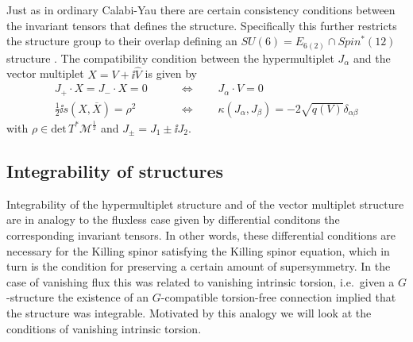 Just as in ordinary Calabi-Yau there are certain consistency conditions between the invariant tensors that defines the structure. Specifically this further restricts the structure group to their overlap defining an $SU(6)=E_{6(2)}\cap Spin^*(12)$ structure \cite{Grana:2009im}. The compatibility condition between the hypermultiplet $J_\alpha$ and the vector multiplet $X=V+\ii \hat{V}$ is given by 
\begin{equation}\label{eq:CompatibilityVectorHyperStructure}
    \begin{aligned}
        J_+ \cdot X = J_-\cdot X = 0\qquad&\Longleftrightarrow\qquad J_\alpha\cdot V = 0\\
        \frac{1}{2}\ii s(X,\overbar{X}) = \rho^2\qquad &\Longleftrightarrow\qquad \kappa(J_\alpha,J_\beta) = -2\sqrt{q(V)}\delta_{\alpha\beta}
    \end{aligned}
\end{equation}
with $\rho\in\text{det}\, T^*\mathcal{M}^\frac{1}{2}$ and $J_\pm = J_1\pm \ii J_2$. 




\subsection{Integrability of structures}

Integrability of the hypermultiplet structure and of the vector multiplet structure are in analogy to the fluxless case given by differential conditons the corresponding invariant tensors. In other words, these differential conditions are necessary for the Killing spinor satisfying the Killing spinor equation, which in turn is the condition for preserving a certain amount of supersymmetry. In the case of vanishing flux this was related to vanishing intrinsic torsion, i.e.\ given a $G$-structure the existence of an $G$-compatible torsion-free connection implied that the structure was integrable. Motivated by this analogy we will look at the conditions of vanishing intrinsic torsion.

